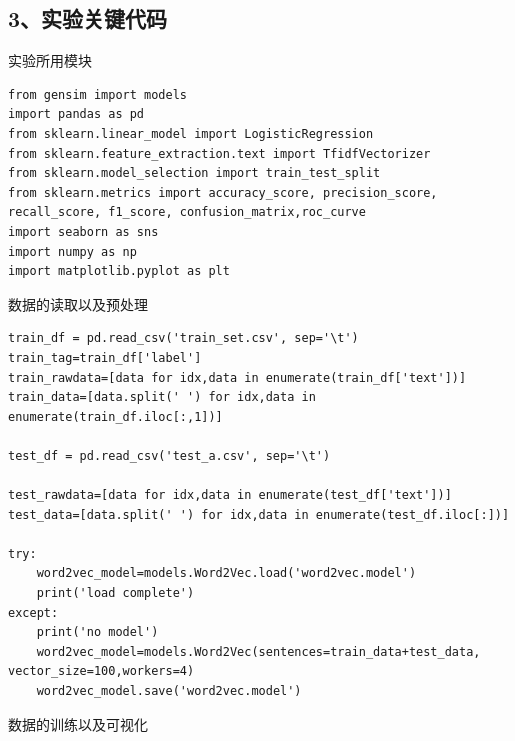 \documentclass{article}
\begin{document}
\subsection*{\Large 3、实验关键代码}
\noindent 实验所用模块
\begin{verbatim}
from gensim import models
import pandas as pd
from sklearn.linear_model import LogisticRegression
from sklearn.feature_extraction.text import TfidfVectorizer
from sklearn.model_selection import train_test_split
from sklearn.metrics import accuracy_score, precision_score, recall_score, f1_score, confusion_matrix,roc_curve
import seaborn as sns
import numpy as np
import matplotlib.pyplot as plt
\end{verbatim}
数据的读取以及预处理
\begin{verbatim}
train_df = pd.read_csv('train_set.csv', sep='\t')
train_tag=train_df['label']
train_rawdata=[data for idx,data in enumerate(train_df['text'])]
train_data=[data.split(' ') for idx,data in enumerate(train_df.iloc[:,1])]

test_df = pd.read_csv('test_a.csv', sep='\t')

test_rawdata=[data for idx,data in enumerate(test_df['text'])]
test_data=[data.split(' ') for idx,data in enumerate(test_df.iloc[:])]

try:
    word2vec_model=models.Word2Vec.load('word2vec.model')
    print('load complete')
except:
    print('no model')
    word2vec_model=models.Word2Vec(sentences=train_data+test_data, vector_size=100,workers=4)
    word2vec_model.save('word2vec.model')

\end{verbatim}
数据的训练以及可视化
\end{document}
